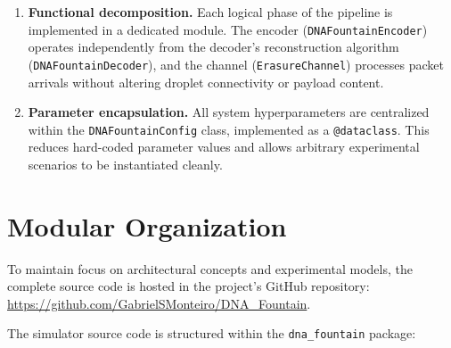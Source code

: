 \begin{enumerate}
    \item \textbf{Functional decomposition.} Each logical phase of the pipeline is implemented in a dedicated module. The encoder (\texttt{DNAFountainEncoder}) operates independently from the decoder's reconstruction algorithm (\texttt{DNAFountainDecoder}), and the channel (\texttt{ErasureChannel}) processes packet arrivals without altering droplet connectivity or payload content.

    \item \textbf{Parameter encapsulation.} All system hyperparameters are centralized within the \texttt{DNAFountainConfig} class, implemented as a \texttt{@dataclass}. This reduces hard-coded parameter values and allows arbitrary experimental scenarios to be instantiated cleanly.
\end{enumerate}

\section{Modular Organization}
\label{sec:modular_organization}

To maintain focus on architectural concepts and experimental models, the complete source code is hosted in the project's GitHub repository: \url{https://github.com/GabrielSMonteiro/DNA_Fountain}.

The simulator source code is structured within the \texttt{dna\_fountain} package:

